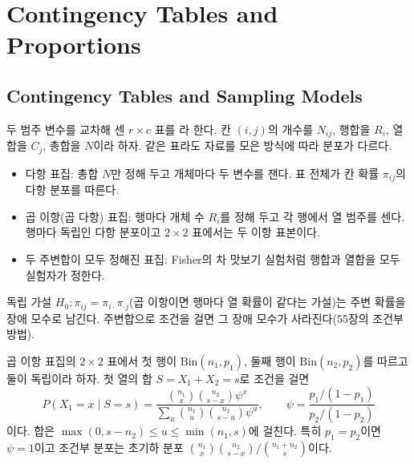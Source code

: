 \chapter{Contingency Tables and Proportions}
\label{ch:contingency}


\section{Contingency Tables and Sampling Models}
\label{sec:sampling-models}

두 범주 변수를 교차해 센 $r\times c$ 표를 라 한다. 칸 $(i,j)$의 개수를 $N_{ij}$, 행합을 $R_i$, 열합을 $C_j$, 총합을 $N$이라 하자. 같은 표라도 자료를 모은 방식에 따라 분포가 다르다.
\begin{itemize}
\item 다항 표집: 총합 $N$만 정해 두고 개체마다 두 변수를 잰다. 표 전체가 칸 확률 $\pi_{ij}$의 다항 분포를 따른다.
\item 곱 이항(곱 다항) 표집: 행마다 개체 수 $R_i$를 정해 두고 각 행에서 열 범주를 센다. 행마다 독립인 다항 분포이고 $2\times2$ 표에서는 두 이항 표본이다.
\item 두 주변합이 모두 정해진 표집: Fisher의 차 맛보기 실험처럼 행합과 열합을 모두 실험자가 정한다.
\end{itemize}
독립 가설 $H_0:\pi_{ij}=\pi_{i\cdot}\pi_{\cdot j}$(곱 이항이면 행마다 열 확률이 같다는 가설)는 주변 확률을 장애 모수로 남긴다. 주변합으로 조건을 걸면 그 장애 모수가 사라진다(55장의 조건부 방법).

\begin{proposition}
\label{prop:hypergeometric}
곱 이항 표집의 $2\times2$ 표에서 첫 행이 $\mathrm{Bin}(n_1,p_1)$, 둘째 행이 $\mathrm{Bin}(n_2,p_2)$를 따르고 둘이 독립이라 하자. 첫 열의 합 $S=X_1+X_2=s$로 조건을 걸면
\[
P(X_1=x\mid S=s)=\frac{\binom{n_1}x\binom{n_2}{s-x}\psi^x}{\sum_u\binom{n_1}u\binom{n_2}{s-u}\psi^u},\qquad\psi=\frac{p_1/(1-p_1)}{p_2/(1-p_2)}
\]
이다. 합은 $\max(0,s-n_2)\le u\le\min(n_1,s)$에 걸친다. 특히 $p_1=p_2$이면 $\psi=1$이고 조건부 분포는 초기하 분포 $\binom{n_1}x\binom{n_2}{s-x}/\binom{n_1+n_2}s$이다.
\end{proposition}

